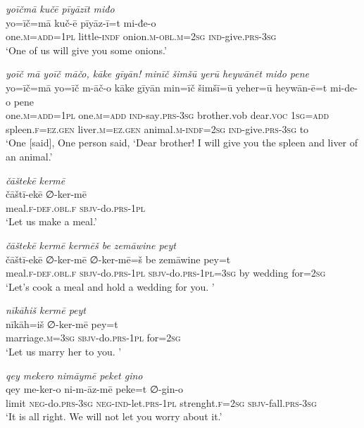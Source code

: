 \ea \label{ŽP.229}
\textit{yoīčmā kučē pīyāzīt miđo} \\ 
\gll yo=īč=mā kuč-ē pīyāz-ī=t mi-đe-o \\ 
 one\textsc{.m}\textsc{=add}\textsc{=1pl} little\textsc{-indf} onion\textsc{.m}\textsc{-obl}\textsc{.m}\textsc{=\textsc{2sg}} \textsc{ind-}give\textsc{.prs}\textsc{-3sg} \\ 
\glt `One of us will give you some onions.'
\z 
 
\ea \label{ŽP.230}
\textit{yoīč mā yoīč māčo, kāke gīyān! minīč šimšū yerū heywānēt mido pene} \\ 
\gll yo=īč=mā yo=īč m-āč-o kāke gīyān min=īč šimšī=ū yeher=ū heywān-ē=t mi-de-o pene \\ 
 one\textsc{.m}\textsc{=add}\textsc{=1pl} one\textsc{.m}\textsc{=add} \textsc{ind-}say\textsc{.prs}\textsc{-3sg} brother.vob dear.\textsc{voc} \textsc{1sg}\textsc{=add} spleen\textsc{.f}\textsc{\textsc{=ez.gen}} liver\textsc{.m}\textsc{\textsc{=ez.gen}} animal\textsc{.m}\textsc{-indf}\textsc{=\textsc{2sg}} \textsc{ind-}give\textsc{.prs}\textsc{-3sg} to \\ 
\glt `One [said], One person said, ‘Dear brother! I will give you the spleen and liver of an animal.'
\z 
 
\ea \label{ŽP.231}
\textit{čāštekē kermē} \\ 
\gll čāštī-ekē ∅-ker-mē \\ 
 meal\textsc{.f}\textsc{-def}\textsc{.obl}\textsc{.f} \textsc{sbjv-}do\textsc{.prs}\textsc{-1pl} \\ 
\glt `Let us make a meal.'
\z 
 
\ea \label{ŽP.232}
\textit{čāštekē kermē kermēš be zemāwine peyt} \\ 
\gll čāštī-ekē ∅-ker-mē ∅-ker-mē=š be zemāwine pey=t \\ 
 meal\textsc{.f}\textsc{-def}\textsc{.obl}\textsc{.f} \textsc{sbjv-}do\textsc{.prs}\textsc{-1pl} \textsc{sbjv-}do\textsc{.prs}\textsc{-1pl}\textsc{=3sg} by wedding for\textsc{=\textsc{2sg}} \\ 
\glt `Let’s cook a meal and hold a wedding for you. '
\z 
 
\ea \label{ŽP.233}
\textit{nīkāhiš kermē peyt} \\ 
\gll nīkāh=iš ∅-ker-mē pey=t \\ 
 marriage\textsc{.m}\textsc{=3sg} \textsc{sbjv-}do\textsc{.prs}\textsc{-1pl} for\textsc{=\textsc{2sg}} \\ 
\glt `Let us marry her to you. '
\z 
 
\ea \label{ŽP.234}
\textit{qey mekero nimāymē peket gino} \\ 
\gll qey me-ker-o ni-m-āz-mē peke=t ∅-gin-o \\ 
 limit \textsc{neg-}do\textsc{.prs}\textsc{-3sg} \textsc{neg-}\textsc{ind-}let\textsc{.prs}\textsc{-1pl} strenght\textsc{.f}\textsc{=\textsc{2sg}} \textsc{sbjv-}fall\textsc{.prs}\textsc{-3sg} \\ 
\glt `It is all right. We will not let you worry about it.'
\z 
 
